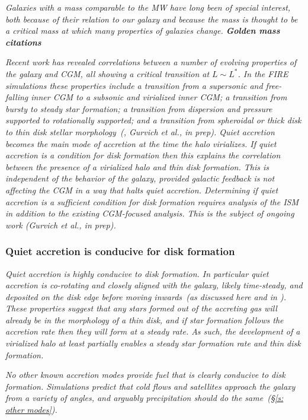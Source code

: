 \documentclass[fleqn,usenatbib]{mnras}
\begin{document}
\textit{
Galaxies with a mass comparable to the MW have long been of special interest, both because of their relation to our galaxy and because the mass is thought to be a critical mass at which many properties of galaxies change.
\textbf{Golden mass citations}
}

\textit{
Recent work has revealed correlations between a number of evolving properties of the galaxy and CGM, all showing a critical transition at $L \sim L^*$.
In the FIRE simulations these properties include a transition from a supersonic and free-falling inner CGM to a subsonic and virialized inner CGM;
a transition from bursty to steady star formation;
a transition from dispersion and pressure supported to rotationally supported;
and a transition from spheroidal or thick disk to thin disk stellar morphology~(\citealt{El-Badry2018a, Stern2020, Yu2021}, Gurvich et al., in prep).
Quiet accretion becomes the main mode of accretion at the time the halo virializes.
If quiet accretion is a condition for disk formation then this explains the correlation between the presence of a virialized halo and thin disk formation.
This is independent of the behavior of the galaxy, provided galactic feedback is not affecting the CGM in a way that halts quiet accretion.
Determining if quiet accretion is a sufficient condition for disk formation requires analysis of the ISM in addition to the existing CGM-focused analysis.
This is the subject of ongoing work (Gurvich et al., in prep).
}

\subsubsection{Quiet accretion is conducive for disk formation}
\label{s: discussion -- disk formation -- conducive}

\textit{
Quiet accretion is highly conducive to disk formation.
In particular quiet accretion is co-rotating and closely aligned with the galaxy, likely time-steady, and deposited on the disk edge before moving inwards~(as discussed here and in \citealt{Trapp2021}).
These properties suggest that any stars formed out of the accreting gas will already be in the morphology of a thin disk, and if star formation follows the accretion rate then they will form at a steady rate.
As such, the development of a virialized halo at least partially enables a steady star formation rate and thin disk formation.
}

\textit{
No other known accretion modes provide fuel that is clearly conducive to disk formation.
Simulations predict that cold flows and satellites approach the galaxy from a variety of angles, and arguably precipitation should do the same~(\S\ref{s: other modes}).
}
\end{document}
